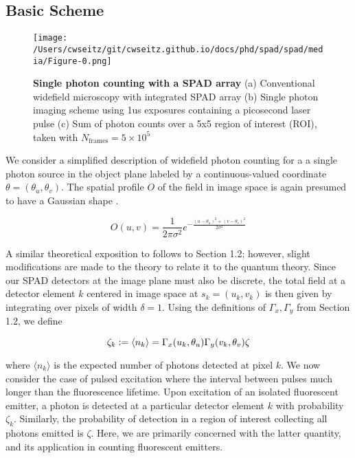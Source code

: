 \subsection{Basic Scheme}

\begin{figure*}[t]
\centering
\texttt{[image: /Users/cwseitz/git/cwseitz.github.io/docs/phd/spad/spad/media/Figure-0.png]}
\caption{\textbf{Single photon counting with a SPAD array} (a) Conventional widefield microscopy with integrated SPAD array (b) Single photon imaging scheme using 1us exposures containing a picosecond laser pulse (c) Sum of photon counts over a 5x5 region of interest (ROI), taken with $N_{\mathrm{frames}}=5\times 10^{5}$}
\label{fig:fig5}
\end{figure*}    

We consider a simplified description of widefield photon counting for a a single photon source in the object plane labeled by a continuous-valued coordinate $\theta=(\theta_u,\theta_v)$. The spatial profile $O$ of the field in image space is again presumed to have a Gaussian shape \parencite{Zhang2007,Richards1959,Gibson1989}. 

\begin{equation}
O(u,v) = \frac{1}{2\pi\sigma^{2}}e^{-\frac{(u-\theta_u)^2+(v-\theta_v)^2}{2\sigma^2}}
\end{equation}

A similar theoretical exposition to follows to Section 1.2; however, slight modifications are made to the theory to relate it to the quantum theory. Since our SPAD detectors at the image plane must also be discrete, the total field at a detector element $k$ centered in image space at $s_k=(u_k,v_k)$ is then given by integrating over pixels of width $\delta=1$. Using the definitions of $\Gamma_x,\Gamma_y$ from Section 1.2, we define

\begin{equation}
\zeta_{k}\vcentcolon = \langle n_{k} \rangle = \Gamma_{x}(u_k,\theta_u)\Gamma_{y}(v_k,\theta_v)\zeta
\end{equation}

where $\langle n_{k} \rangle$ is the expected number of photons detected at pixel $k$. We now consider the case of pulsed excitation where the interval between pulses much longer than the fluorescence lifetime. Upon excitation of an isolated fluorescent emitter, a photon is detected at a particular detector element $k$ with probability $\zeta_{k}$. Similarly, the probability of detection in a region of interest collecting all photons emitted is $\zeta$. Here, we are primarily concerned with the latter quantity, and its application in counting fluorescent emitters.


